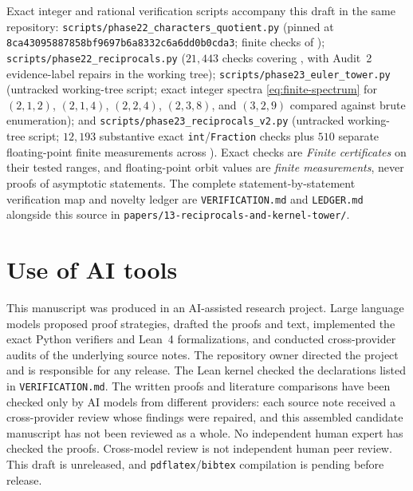\documentclass[11pt]{article}
\newcommand{\ttt}[1]{\texttt{#1}}
\newcommand{\phaseXXIIcommit}{8ca43095887858bf9697b6a8332c6a6dd0b0cda3}
\begin{document}
Exact integer and rational verification scripts accompany this draft in the same repository:
\ttt{scripts/phase22\_characters\_quotient.py} (pinned at \ttt{\phaseXXIIcommit}; finite checks of );
\ttt{scripts/phase22\_reciprocals.py} ($21{,}443$ checks covering , with Audit~2 evidence-label repairs in the working tree);
\ttt{scripts/phase23\_euler\_tower.py} (untracked working-tree script; exact integer spectra \eqref{eq:finite-spectrum} for $(2,1,2)$, $(2,1,4)$, $(2,2,4)$, $(2,3,8)$, and $(3,2,9)$ compared against brute enumeration); and
\ttt{scripts/phase23\_reciprocals\_v2.py} (untracked working-tree script; $12{,}193$ substantive exact \ttt{int}/\ttt{Fraction} checks plus $510$ separate floating-point finite measurements across ).
Exact checks are \emph{Finite certificates} on their tested ranges, and floating-point orbit values are \emph{finite measurements}, never proofs of asymptotic statements. The complete statement-by-statement verification map and novelty ledger are \ttt{VERIFICATION.md} and \ttt{LEDGER.md} alongside this source in \ttt{papers/13-reciprocals-and-kernel-tower/}.

\section{Use of AI tools}\label{sec:ai}

This manuscript was produced in an AI-assisted research project. Large language models proposed proof strategies, drafted the proofs and text, implemented the exact Python verifiers and Lean~4 formalizations, and conducted cross-provider audits of the underlying source notes. The repository owner directed the project and is responsible for any release. The Lean kernel checked the declarations listed in \ttt{VERIFICATION.md}. The written proofs and literature comparisons have been checked only by AI models from different providers: each source note received a cross-provider review whose findings were repaired, and this assembled candidate manuscript has not been reviewed as a whole. No independent human expert has checked the proofs. Cross-model review is not independent human peer review. This draft is unreleased, and \ttt{pdflatex}/\ttt{bibtex} compilation is pending before release.



\end{document}
